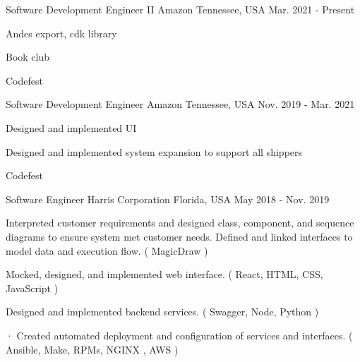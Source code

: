 

\begin{cventries}

  \cventry
    {Software Development Engineer II} %
    {Amazon} %
    {Tennessee, USA} %
    {Mar. 2021 - Present} %
    {
      \begin{cvitems} %
        \item {Andes export, cdk library}
        \item {Book club}
        \item {Codefest}
      \end{cvitems}
    }

  \cventry
    {Software Development Engineer} %
    {Amazon} %
    {Tennessee, USA} %
    {Nov. 2019 - Mar. 2021} %
    {
      \begin{cvitems} %
        \item {Designed and implemented UI}
        \item {Designed and implemented system expansion to support all shippers}
        \item {Codefest}
      \end{cvitems}
    }

  \cventry
    {Software Engineer} %
    {Harris Corporation} %
    {Florida, USA} %
    {May 2018 - Nov. 2019} %
    {
      \begin{cvitems} %
        \item {Interpreted customer requirements and designed class, component, and sequence diagrams to ensure system met customer needs. Defined and linked interfaces to model data and execution flow. ( MagicDraw )}
        \item {Mocked, designed, and implemented web interface. ( React, HTML, CSS, JavaScript )}
        \item {Designed and implemented backend services. ( Swagger, Node, Python )}
        \item {· Created automated deployment and configuration of services and interfaces. ( Ansible, Make, RPMs, NGINX , AWS )}
      \end{cvitems}
    }


\end{cventries}

